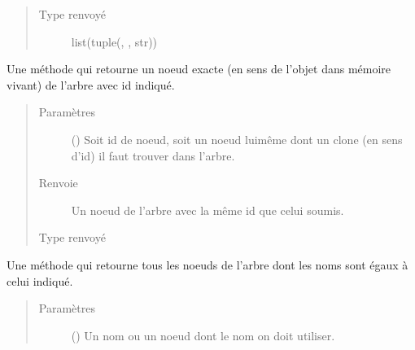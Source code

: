 \documentclass[letterpaper,10pt,french]{sphinxmanual}
\begin{document}
\begin{fulllineitems}
\begin{fulllineitems}
\begin{quote}
\begin{description}
\item[{Type renvoyé}] \leavevmode
list(tuple({\hyperref[\detokenize{index:StrategyTree.NodeST}]{}}, {\hyperref[\detokenize{index:StrategyTree.NodeST}]{}}, str))

\end{description}\end{quote}

\end{fulllineitems}


\begin{fulllineitems}
\label{\detokenize{index:StrategyTree.StrategyTree.get_node}}
Une méthode qui retourne un noeud exacte (en sens de l’objet dans mémoire vivant) de l’arbre avec id indiqué.
\begin{quote}\begin{description}
\item[{Paramètres}] \leavevmode
{} () \textendash{} Soit id de noeud, soit un noeud lui\sphinxhyphen{}même dont un clone (en sens d’id) il faut trouver dans l’arbre.

\item[{Renvoie}] \leavevmode
{} \textendash{} Un noeud de l’arbre avec la même id que celui soumis.

\item[{Type renvoyé}] \leavevmode
{\hyperref[\detokenize{index:StrategyTree.NodeST}]{}}

\end{description}\end{quote}

\end{fulllineitems}


\begin{fulllineitems}
\label{\detokenize{index:StrategyTree.StrategyTree.get_node_by_name}}
Une méthode qui retourne tous les noeuds de l’arbre dont les noms sont égaux à celui indiqué.
\begin{quote}\begin{description}
\item[{Paramètres}] \leavevmode
{} () \textendash{} Un nom ou un noeud dont le nom on doit utiliser.


\end{description}
\end{quote}
\end{fulllineitems}
\end{fulllineitems}
\end{document}
